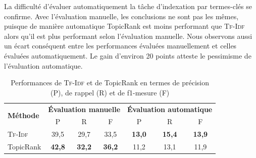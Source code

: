         La difficulté d'évaluer automatiquement la tâche d'indexation par
        termes-clés se confir\-me. Avec l'évaluation manuelle, les conclusions ne
        sont pas les mêmes, puisque de manière automatique TopicRank est moins
        performant que \textsc{Tf-Idf} alors qu'il est plus performant selon
        l'évaluation manuelle. Nous observons aussi un écart conséquent entre
        les performances évaluées manuellement et celles évaluées
        automatiquement. Le gain d'environ 20 points atteste le pessimisme de
        l'évaluation automatique.
        \begin{table}[h!]
          \centering
          \begin{tabular}{l|c@{~~~~~~}cc|c@{~~~~~~~~}cc}
            \toprule
            \multirow{2}{*}{\textbf{Méthode}} & \multicolumn{3}{c|}{\textbf{Évaluation manuelle}} & \multicolumn{3}{c}{\textbf{Évaluation automatique}}\\
            \cline{2-7}
            & P & R & F & P & R & F\\
            \hline
            \textsc{Tf-Idf} & 39,5 & 29,7 & 33,5 & \textbf{13,0} & \textbf{15,4} & \textbf{13,9}\\
            TopicRank & \textbf{42,8} & \textbf{32,2} & \textbf{36,2} & 11,2 & 13,1 & 11,9\\
            \bottomrule
          \end{tabular}
          \caption[
            Performances de \textsc{Tf-Idf} et de TopicRank en termes de
            précision, de rappel et de f1-mesure
          ]{
            Performances de \textsc{Tf-Idf} et de TopicRank en termes de
            précision (P), de rappel (R) et de f1-mesure (F)
            \label{tab:main-automatic_evaluation_of_keyphrase_annotation-results-topicrank-prf}}
        \end{table}
      

